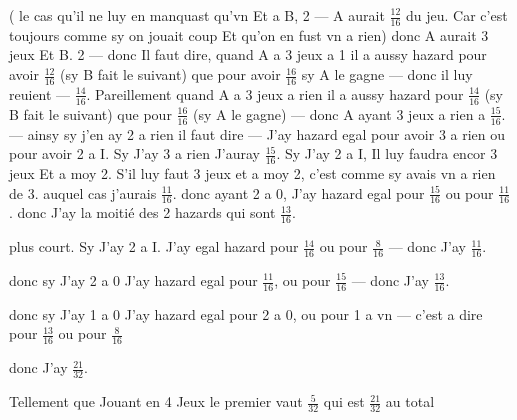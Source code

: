 \documentclass[11pt,a4paper]{article}
\begin{document}
( le cas qu'il ne luy en manquast qu'vn Et a B, 2 — A aurait $\frac{12}{16}$ du jeu. Car c'est toujours comme sy on jouait  \ill{} coup Et qu'on en fust vn a rien) donc A aurait 3 jeux Et B. 2 — donc Il faut dire, quand A a 3 jeux a 1 il a aussy hazard pour avoir $\frac{12}{16}$ (sy B fait le suivant) que pour avoir $\frac{16}{16}$ sy A le gagne — donc il luy reuient — $\frac{14}{16}$. Pareillement quand A a 3 jeux a rien il a aussy hazard pour $\frac{14}{16}$ (sy B fait le suivant) que pour $\frac{16}{16}$ (sy A le gagne) — donc A ayant 3 jeux a rien a $\frac{15}{16}$. — ainsy sy j'en ay 2 a rien il faut dire — J'ay hazard egal pour avoir 3 a rien ou pour avoir 2 a I. Sy J'ay 3 a rien J'auray $\frac{15}{16}$. Sy J'ay 2 a I, Il luy faudra encor 3 jeux Et a moy 2. S'il luy faut 3 jeux et a moy 2, c'est comme sy  avais vn a rien de 3.  auquel cas j'aurais $\frac{11}{16}$. donc ayant 2 a 0, J'ay hazard egal pour $\frac{15}{16}$ ou pour $\frac{11}{16}$. donc J'ay la moitié des 2 hazards qui sont $\frac{13}{16}$.

plus court. Sy J'ay 2 a I. J'ay egal hazard pour $\frac{14}{16}$ ou pour $\frac{8}{16}$ — donc J'ay $\frac{11}{16}$.

donc sy J'ay 2 a 0 J'ay hazard egal pour $\frac{11}{16}$, ou pour  $\frac{15}{16}$ — donc J'ay $\frac{13}{16}$.

donc sy J'ay 1 a 0 J'ay hazard egal pour 2 a 0, ou pour 1 a vn — c'est a dire pour $\frac{13}{16}$ ou pour $\frac{8}{16}$

donc J'ay $\frac{21}{32}$.

Tellement que Jouant en 4 Jeux le premier vaut $\frac{5}{32}$ qui est $\frac{21}{32}$ au total
\end{document}
